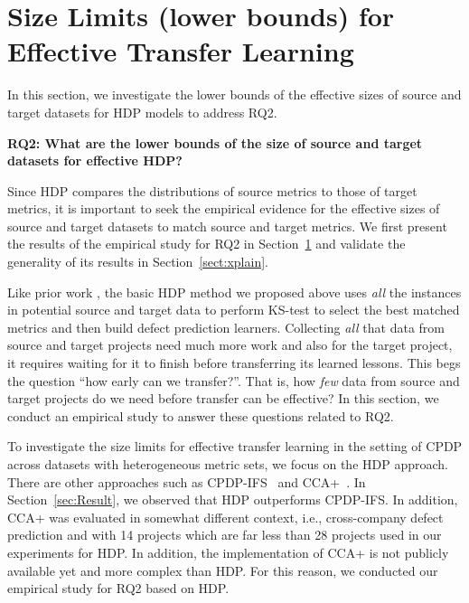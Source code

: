 
\section{Size Limits (lower bounds) for Effective Transfer Learning}
\label{sec:sizelimit}

In this section, we investigate the lower bounds of the effective sizes of source and target datasets for HDP models to address RQ2.

{\bf RQ2: What are the  lower  bounds  of  the  size  of source and target  datasets  for  effective HDP?}

Since HDP compares the distributions of source metrics to those of target metrics, it is important to seek the empirical evidence for the effective sizes of source and target datasets to match source and target metrics. We first present the results of the empirical study for RQ2 in Section~\ref{sec:sizelimit} and validate the generality of its results in Section~\ref{sect:xplain}.

Like prior work \cite{Nam13,
  Ma12, Rahman12, Ryu14,
  Zhang14}, the basic HDP method we
proposed above uses {\em all} the instances in potential source and target data to
perform KS-test to select the best matched metrics and then build
defect prediction learners.
Collecting {\em all} that data from source and target projects need much more work and also
for the target project, it requires waiting for it to finish before
transferring its learned lessons. This begs the question ``how early can we transfer?''.
That is, how {\em few} data from source and target projects do we need before transfer can be effective? In this section, we conduct an empirical study to answer these questions related to RQ2.

To investigate the size limits for effective transfer learning in the setting of CPDP across datasets with heterogeneous metric sets, we focus on the HDP approach. There are other approaches such as CPDP-IFS~\cite{He14} and CCA+~\cite{Jing15}. In Section~\ref{sec:Result}, we observed that HDP outperforms CPDP-IFS. In addition, CCA+ was evaluated in somewhat different context, i.e., cross-company defect prediction and with 14 projects which are far less than 28 projects used in our experiments for HDP. In addition, the implementation of CCA+ is not publicly available yet and more complex than HDP. For this reason, we conducted our empirical study for RQ2 based on HDP.

